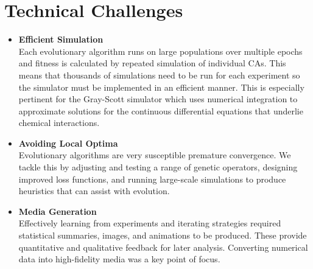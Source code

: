 \section{Technical Challenges}

\begin{itemize}
    \item \textbf{Efficient Simulation}\\ Each evolutionary algorithm runs on large populations over multiple epochs and fitness is calculated by repeated simulation of individual CAs. This means that thousands of simulations need to be run for each experiment so the simulator must be implemented in an efficient manner. This is especially pertinent for the Gray-Scott simulator which uses numerical integration to approximate solutions for the continuous differential equations that underlie chemical interactions.
    \item \textbf{Avoiding Local Optima}\\ Evolutionary algorithms are very susceptible premature convergence. We tackle this by adjusting and testing a range of genetic operators, designing improved loss functions, and running large-scale simulations to produce heuristics that can assist with evolution.
    \item \textbf{Media Generation}\\ Effectively learning from experiments and iterating strategies required statistical summaries, images, and animations to be produced. These provide quantitative and qualitative feedback for later analysis. Converting numerical data into high-fidelity media was a key point of focus.
\end{itemize}
